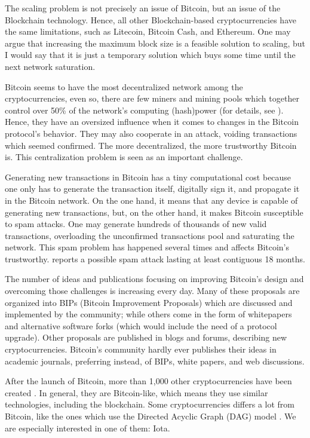 The scaling problem is not precisely an issue of Bitcoin, but an issue of the Blockchain technology. Hence, all other Blockchain-based cryptocurrencies have the same limitations, such as Litecoin, Bitcoin Cash, and Ethereum. One may argue that increasing the maximum block size is a feasible solution to scaling, but I would say that it is just a temporary solution which buys some time until the next network saturation.

Bitcoin seems to have the most decentralized network among the cryptocurrencies, even so, there are few miners and mining pools which together control over 50\% of the network’s computing (hash)power (for details, see \citet{gencer2018decentralization}). Hence, they have an oversized influence when it comes to changes in the Bitcoin protocol's behavior. They may also cooperate in an attack, voiding transactions which seemed confirmed. The more decentralized, the more trustworthy Bitcoin is. This centralization problem is seen as an important challenge.

Generating new transactions in Bitcoin has a tiny computational cost because one only has to generate the transaction itself, digitally sign it, and propagate it in the Bitcoin network. On the one hand, it means that any device is capable of generating new transactions, but, on the other hand, it makes Bitcoin susceptible to spam attacks. One may generate hundreds of thousands of new valid transactions, overloading the unconfirmed transactions pool and saturating the network. This spam problem has happened several times and affects Bitcoin's trustworthy. \citet{bitcoinspam2017} reports a possible spam attack lasting at least contiguous 18 months.

The number of ideas and publications focusing on improving Bitcoin's design and overcoming those challenges is increasing every day. Many of these proposals are organized into BIPs (Bitcoin Improvement Proposals) which are discussed and implemented by the community; while others come in the form of whitepapers and alternative software forks (which would include the need of a protocol upgrade). Other proposals are published in blogs and forums, describing new cryptocurrencies. Bitcoin's community hardly ever publishes their ideas in academic journals, preferring instead, of BIPs, white papers, and web discussions.

After the launch of Bitcoin, more than 1,000 other cryptocurrencies have been created \citep{coinmarketcap}. In general, they are Bitcoin-like, which means they use similar technologies, including the blockchain. Some cryptocurrencies differs a lot from Bitcoin, like the ones which use the Directed Acyclic Graph (DAG) model \citep{dagdiscussion2014, tangle2016, dagcoin2015, sompolinsky2013, lewenberg2015, vorick2015}. We are especially interested in one of them: Iota.

